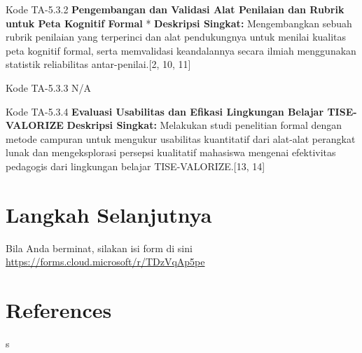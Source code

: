 \documentclass[
  letterpaper,
  DIV=11,
  numbers=noendperiod]{scrreprt}
\begin{document}
Kode TA-5.3.2 \textbf{Pengembangan dan Validasi Alat Penilaian dan
Rubrik untuk Peta Kognitif Formal} * \textbf{Deskripsi Singkat:}
Mengembangkan sebuah rubrik penilaian yang terperinci dan alat
pendukungnya untuk menilai kualitas peta kognitif formal, serta
memvalidasi keandalannya secara ilmiah menggunakan statistik
reliabilitas antar-penilai.{[}2, 10, 11{]}

Kode TA-5.3.3 N/A

Kode TA-5.3.4 \textbf{Evaluasi Usabilitas dan Efikasi Lingkungan Belajar
TISE-VALORIZE} \textbf{Deskripsi Singkat:} Melakukan studi penelitian
formal dengan metode campuran untuk mengukur usabilitas kuantitatif dari
alat-alat perangkat lunak dan mengeksplorasi persepsi kualitatif
mahasiswa mengenai efektivitas pedagogis dari lingkungan belajar
TISE-VALORIZE.{[}13, 14{]}


\chapter{Langkah Selanjutnya}\label{langkah-selanjutnya}

Bila Anda berminat, silakan isi form di sini
\url{https://forms.cloud.microsoft/r/TDzVqAp5pe}


\chapter*{References}\label{references}


s
\end{document}
